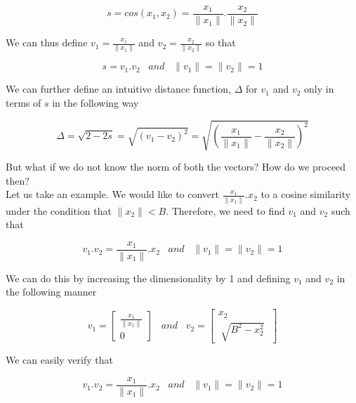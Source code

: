 \documentclass[11pt, twosides]{article}
\begin{document}
\begin{equation}
    s = cos(x_1,x_2) = \frac{x_1}{\|x_1\|}.\frac{x_2}{\|x_2\|}
\end{equation}

We can thus define $v_1 = \frac{x_1}{\|x_1\|}$ and $v_2 = \frac{x_2}{\|x_2\|}$ so that

\begin{equation}
    s = v_1.v_2 \;\;\; and \;\;\; \|v_1\| = \|v_2\| = 1
\end{equation}

We can further define an intuitive distance function, $\Delta$ for $v_1$ and $v_2$ only in terms of $s$ in the following way

\begin{equation}
    \Delta = \sqrt{2-2s} = \sqrt{(v_1-v_2)^2} = \sqrt{\left(\frac{x_1}{\|x_1\|}-\frac{x_2}{\|x_2\|}\right)^2}
\end{equation}

But what if we do not know the norm of both the vectors? How do we proceed then?\\

Let us take an example. We would like to convert $\frac{x_1}{\|x_1\|}.x_2$ to a cosine similarity under the condition that $\|x_2\|<B$. Therefore, we need to find $v_1$ and $v_2$ such that 

\begin{equation}
    v_1.v_2 = \frac{x_1}{\|x_1\|}.x_2 \; \; \; and \; \; \; \|v_1\| = \|v_2\| = 1
\end{equation}

We can do this by increasing the dimensionality by 1 and defining $v_1$ and $v_2$ in the following manner

\begin{equation}
    v_1 = \begin{bmatrix}
        \frac{x_1}{\|x_1\|} \\
        0
    \end{bmatrix} 
    \;\;\; and \;\;\;
    v_2 = \begin{bmatrix}
         x_2  \\
        \;\sqrt{B^2-x_2^2}\;
    \end{bmatrix} 
\end{equation}

We can easily verify that

\begin{equation}
    v_1.v_2 = \frac{x_1}{\|x_1\|}.x_2 \; \; \; and \; \; \; \|v_1\| = \|v_2\| = 1
\end{equation}
\end{document}

